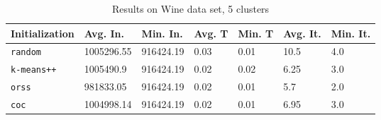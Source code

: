 \begin{table}[h]
	\begin{center}
		\begin{tabular}{|l|l|l|l|l|l|l|}
			\hline
			Initialization & Avg. In. & Min. In. & Avg. T & Min. T & Avg. It. & Min. It.\\\hline
			\texttt{random} & 1005296.55 & 916424.19 & 0.03 & 0.01 & 10.5 & 4.0\\\hline
			\texttt{k-means++} & 1005490.9 & 916424.19 & 0.02 & 0.02 & 6.25 & 3.0\\\hline
			\texttt{orss} & 981833.05 & 916424.19 & 0.02 & 0.01 & 5.7 & 2.0\\\hline
			\texttt{coc} & 1004998.14 & 916424.19 & 0.02 & 0.01 & 6.95 & 3.0\\\hline
		\end{tabular}
		\caption{Results on Wine data set, 5 clusters}
		\label{tbl:Wine5}
	\end{center}
\end{table}

